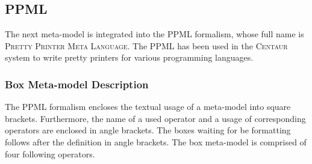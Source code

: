\documentclass[12pt,notitlepage,a4paper]{report}
\begin{document}
\subsection {PPML}

The next meta-model is integrated into the PPML \cite{PPML} formalism, whose full name is \textsc{Pretty Printer Meta Language}. The PPML has been used in the \textsc{Centaur} system \cite{Centaur} to write pretty printers for various programming languages.

\subsubsection{Box Meta-model Description}

The PPML formalism encloses the textual usage of a meta-model into square brackets. Furthermore, the name of a used operator and a usage of corresponding operators are enclosed in angle brackets. The boxes waiting for be formatting follows after the definition in angle brackets. The box meta-model is comprised of four following operators.
\end{document}
